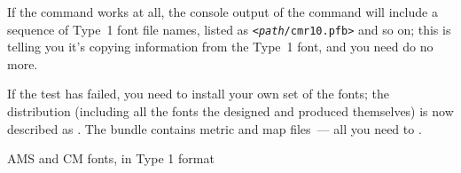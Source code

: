 If the command works at all, the console output of the command will
include a sequence of Type~1 font file names, listed as
\texttt{<\emph{path}/cmr10.pfb>} and so on; this is 
telling you it's copying information from the Type~1 font, and you
need do no more.

If the test has failed, you need to install your own set of the fonts;
the distribution (including all the fonts the  designed and
produced themselves) is now described as .  The
bundle contains metric and map files~--- all you need to
.
\begin{ctanrefs}
\item[AMS and CM fonts, in Type 1 format]
\end{ctanrefs}


